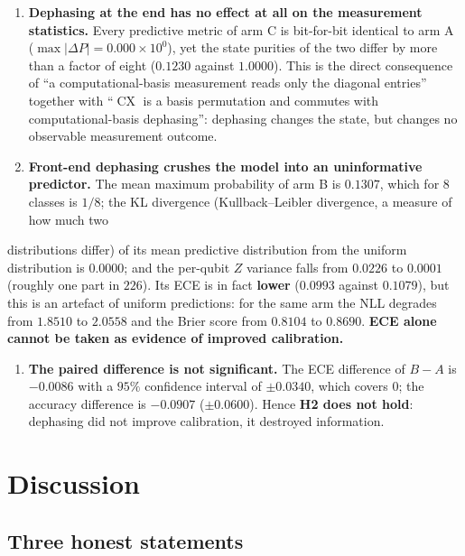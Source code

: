 \documentclass{article}
\begin{document}
\begin{enumerate}
\item
  \textbf{Dephasing at the end has no effect at all on the measurement
  statistics.} Every predictive metric of arm C is bit-for-bit identical
  to arm A (\(\max\left| {\Delta P} \right| = 0.000 \times 10^{0}\)),
  yet the state purities of the two differ by more than a factor of
  eight (\(0.1230\) against \(1.0000\)). This is the direct consequence
  of ``a computational-basis measurement reads only the diagonal
  entries'' together with ``\(\operatorname{CX}\) is a basis permutation
  and commutes with computational-basis dephasing'': dephasing changes
  the state, but changes no observable measurement outcome.
\item
  \textbf{Front-end dephasing crushes the model into an uninformative
  predictor.} The mean maximum probability of arm B is \(0.1307\), which
  for \(8\) classes is \(1/8\); the KL divergence (Kullback--Leibler
  divergence, a measure of how much two
\end{enumerate}

distributions differ) of its mean predictive distribution from the
uniform distribution is \(0.0000\); and the per-qubit \(Z\) variance
falls from \(0.0226\) to \(0.0001\) (roughly one part in \(226\)). Its
ECE is in fact \textbf{lower} (\(0.0993\) against \(0.1079\)), but this
is an artefact of uniform predictions: for the same arm the NLL degrades
from \(1.8510\) to \(2.0558\) and the Brier score from \(0.8104\) to
\(0.8690\). \textbf{ECE alone cannot be taken as evidence of improved
calibration.}

\begin{enumerate}
\item
  \textbf{The paired difference is not significant.} The ECE difference
  of \(B - A\) is \(- 0.0086\) with a \(95\%\) confidence interval of
  \(\pm 0.0340\), which covers \(0\); the accuracy difference is
  \(- 0.0907\) (\(\pm 0.0600\)). Hence \textbf{H2 does not hold}:
  dephasing did not improve calibration, it destroyed information.
\end{enumerate}

\section{Discussion}

\subsection{Three honest statements}
\end{document}
